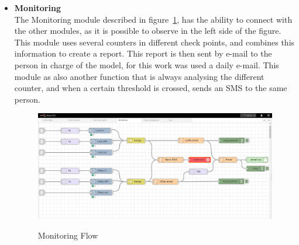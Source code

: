 \begin{itemize}
   \item \textbf{Monitoring} \\
   The Monitoring module described in figure~\ref{fig:Monitoring}, has the ability to connect with the other modules, as it is possible to observe in the left side of the figure. This module uses several counters in different check points, and combines this information to create a report. This report is then sent by e-mail to the person in charge of the model, for this work was used a daily e-mail. This module as also another function that is always analysing the different counter, and when a certain threshold is crossed, sends an SMS to the same person.
 
  \begin{figure}[htbp]
  \centering
  
    {\includegraphics[width=\linewidth]{Chapters/Figures/Monitoring.JPG}}
 
  \caption{Monitoring Flow}
  \label{fig:Monitoring}
\end{figure}

\end{itemize}

